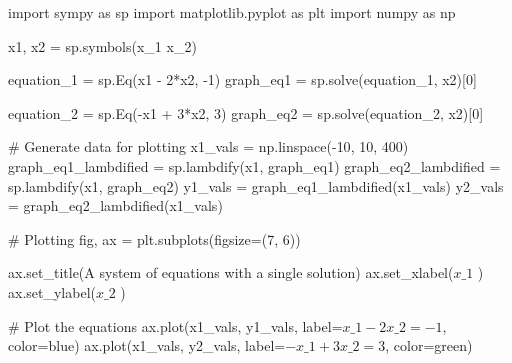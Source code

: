 \documentclass[
  letterpaper,
  DIV=11,
  numbers=noendperiod]{scrreprt}
\newenvironment{Shaded}{\begin{snugshade}}{\end{snugshade}}
\newcommand{\CommentTok}[1]{\textcolor[rgb]{0.37,0.37,0.37}{#1}}
\newcommand{\DecValTok}[1]{\textcolor[rgb]{0.68,0.00,0.00}{#1}}
\newcommand{\ImportTok}[1]{\textcolor[rgb]{0.00,0.46,0.62}{#1}}
\newcommand{\NormalTok}[1]{\textcolor[rgb]{0.00,0.23,0.31}{#1}}
\newcommand{\OperatorTok}[1]{\textcolor[rgb]{0.37,0.37,0.37}{#1}}
\newcommand{\StringTok}[1]{\textcolor[rgb]{0.13,0.47,0.30}{#1}}
\begin{document}
\begin{Shaded}
\begin{Highlighting}[]
\ImportTok{import}\NormalTok{ sympy }\ImportTok{as}\NormalTok{ sp}
\ImportTok{import}\NormalTok{ matplotlib.pyplot }\ImportTok{as}\NormalTok{ plt}
\ImportTok{import}\NormalTok{ numpy }\ImportTok{as}\NormalTok{ np}

\NormalTok{x1, x2 }\OperatorTok{=}\NormalTok{ sp.symbols(}\StringTok{\textquotesingle{}x\_1 x\_2\textquotesingle{}}\NormalTok{)}

\NormalTok{equation\_1 }\OperatorTok{=}\NormalTok{ sp.Eq(x1 }\OperatorTok{{-}} \DecValTok{2}\OperatorTok{*}\NormalTok{x2, }\OperatorTok{{-}}\DecValTok{1}\NormalTok{)}
\NormalTok{graph\_eq1 }\OperatorTok{=}\NormalTok{ sp.solve(equation\_1, x2)[}\DecValTok{0}\NormalTok{]}

\NormalTok{equation\_2 }\OperatorTok{=}\NormalTok{ sp.Eq(}\OperatorTok{{-}}\NormalTok{x1 }\OperatorTok{+} \DecValTok{3}\OperatorTok{*}\NormalTok{x2, }\DecValTok{3}\NormalTok{)}
\NormalTok{graph\_eq2 }\OperatorTok{=}\NormalTok{ sp.solve(equation\_2, x2)[}\DecValTok{0}\NormalTok{]}

\CommentTok{\# Generate data for plotting}
\NormalTok{x1\_vals }\OperatorTok{=}\NormalTok{ np.linspace(}\OperatorTok{{-}}\DecValTok{10}\NormalTok{, }\DecValTok{10}\NormalTok{, }\DecValTok{400}\NormalTok{)}
\NormalTok{graph\_eq1\_lambdified }\OperatorTok{=}\NormalTok{ sp.lambdify(x1, graph\_eq1)}
\NormalTok{graph\_eq2\_lambdified }\OperatorTok{=}\NormalTok{ sp.lambdify(x1, graph\_eq2)}
\NormalTok{y1\_vals }\OperatorTok{=}\NormalTok{ graph\_eq1\_lambdified(x1\_vals)}
\NormalTok{y2\_vals }\OperatorTok{=}\NormalTok{ graph\_eq2\_lambdified(x1\_vals)}

\CommentTok{\# Plotting}
\NormalTok{fig, ax }\OperatorTok{=}\NormalTok{ plt.subplots(figsize}\OperatorTok{=}\NormalTok{(}\DecValTok{7}\NormalTok{, }\DecValTok{6}\NormalTok{))}

\NormalTok{ax.set\_title(}\StringTok{\textquotesingle{}A system of equations with a single solution\textquotesingle{}}\NormalTok{)}
\NormalTok{ax.set\_xlabel(}\StringTok{\textquotesingle{}$x\_1$                                                                                                                            \textquotesingle{}}\NormalTok{)}
\NormalTok{ax.set\_ylabel(}\StringTok{\textquotesingle{}$x\_2$                                                                                                    \textquotesingle{}}\NormalTok{)}

\CommentTok{\# Plot the equations}
\NormalTok{ax.plot(x1\_vals, y1\_vals, label}\OperatorTok{=}\StringTok{\textquotesingle{}$x\_1 {-} 2x\_2 = {-}1$\textquotesingle{}}\NormalTok{, color}\OperatorTok{=}\StringTok{\textquotesingle{}blue\textquotesingle{}}\NormalTok{)}
\NormalTok{ax.plot(x1\_vals, y2\_vals, label}\OperatorTok{=}\StringTok{\textquotesingle{}${-}x\_1 + 3x\_2 = 3$\textquotesingle{}}\NormalTok{, color}\OperatorTok{=}\StringTok{\textquotesingle{}green\textquotesingle{}}\NormalTok{)}


\end{Highlighting}
\end{Shaded}
\end{document}

